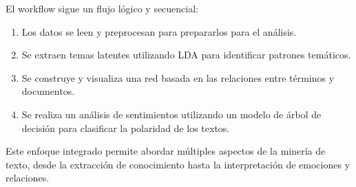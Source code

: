 El workflow sigue un flujo lógico y secuencial:
\begin{enumerate}
	\item Los datos se leen y preprocesan para prepararlos para el análisis.
	
	\item Se extraen temas latentes utilizando LDA para identificar patrones temáticos.
	
	\item Se construye y visualiza una red basada en las relaciones entre términos y documentos.
	
	\item Se realiza un análisis de sentimientos utilizando un modelo de árbol de decisión para clasificar la polaridad de los textos.
\end{enumerate}

Este enfoque integrado permite abordar múltiples aspectos de la minería de texto, desde la extracción de conocimiento hasta la interpretación de emociones y relaciones.




